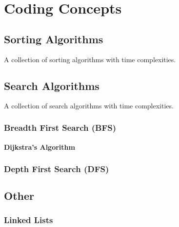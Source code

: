 \chapter{Coding Concepts}
\label{coding}

\section{Sorting Algorithms}
\label{coding:sorts}

\begin{table}[H]
\centering
\begingroup
\renewcommand*{\arraystretch}{1}

\endgroup
\caption{
A collection of sorting algorithms with time complexities.
}
\label{tab:sorting_table}
\end{table}

\section{Search Algorithms}
\label{coding:searchs}

\begin{table}[H]
\centering
\begingroup
\renewcommand*{\arraystretch}{1}

\endgroup
\caption{
A collection of search algorithms with time complexities.
}
\label{tab:search_table}
\end{table}

\subsection{Breadth First Search (BFS)}
\label{coding:other:bfs}

\subsubsection{Dijkstra's Algorithm}
\label{coding:other:bfs:dijkstra}

\subsection{Depth First Search (DFS)}
\label{coding:other:dfs}

\section{Other}
\label{coding:other}

\subsection{Linked Lists}
\label{coding:other:lls}

